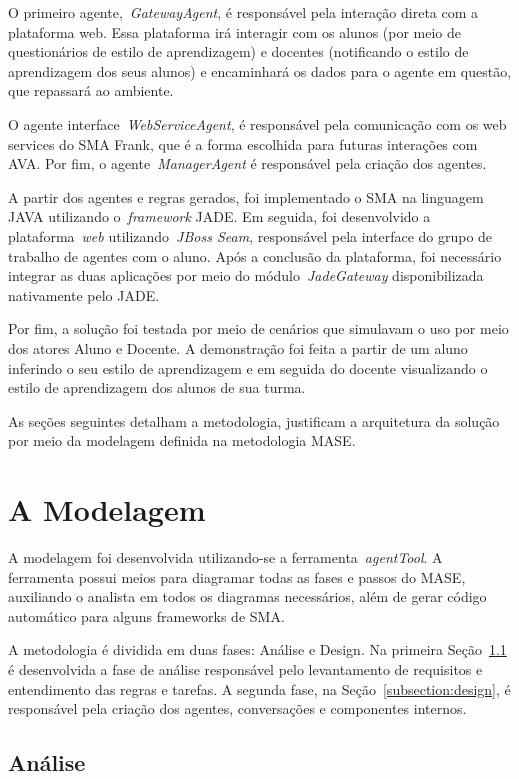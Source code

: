 O primeiro agente,~\emph{GatewayAgent}, é responsável pela interação direta com a plataforma web. Essa plataforma irá interagir com os alunos (por meio de questionários de estilo de aprendizagem) e docentes (notificando o estilo de aprendizagem dos seus alunos) e encaminhará os dados para o agente em questão, que repassará ao ambiente.

O agente interface~\emph{WebServiceAgent}, é responsável pela comunicação com os web services do SMA Frank, que é a forma escolhida para futuras interações com AVA. Por fim, o agente~\emph{ManagerAgent} é responsável pela criação dos agentes.

A partir dos agentes e regras gerados, foi implementado o SMA na linguagem JAVA utilizando o~\emph{framework} JADE. Em seguida, foi desenvolvido a plataforma~\emph{web} utilizando~\emph{JBoss Seam}, responsável pela interface do grupo de trabalho de agentes com o aluno. Após a conclusão da plataforma, foi necessário integrar as duas aplicações por meio do módulo~\emph{JadeGateway} disponibilizada nativamente pelo JADE.

Por fim, a solução foi testada por meio de cenários que simulavam o uso por meio dos atores Aluno e Docente. A demonstração foi feita a partir de um aluno inferindo o seu estilo de aprendizagem e em seguida do docente visualizando o estilo de aprendizagem dos alunos de sua turma.

As seções seguintes detalham a metodologia, justificam a arquitetura da solução por meio da modelagem definida na metodologia MASE.

\section{A Modelagem}\label{section:modelagem}

A modelagem foi desenvolvida utilizando-se a ferramenta~\emph{agentTool}. A ferramenta possui meios para diagramar todas as fases e passos do MASE, auxiliando o analista em todos os diagramas necessários, além de gerar código automático para alguns frameworks de SMA.

A metodologia é dividida em duas fases: Análise e Design. Na primeira Seção~\ref{subsection:analise} é desenvolvida a fase de análise responsável pelo levantamento de requisitos e entendimento das regras e tarefas. A segunda fase, na Seção~\ref{subsection:design}, é responsável pela criação dos agentes, conversações e componentes internos.

\subsection{Análise}\label{subsection:analise}

